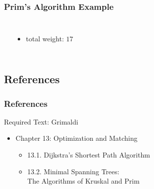 \documentclass[dvipsnames]{beamer}
\begin{document}
\begin{frame}
  \frametitle{Prim's Algorithm Example}

  \begin{example}[$7 \nless 7$]
    \begin{columns}
      \begin{center}
      \end{center}

      \begin{itemize}
        \item total weight: $17$
      \end{itemize}
    \end{columns}
  \end{example}
\end{frame}

\subsection*{References}

\begin{frame}
  \frametitle{References}

  \begin{block}{Required Text: Grimaldi}
    \begin{itemize}
      \item Chapter 13: Optimization and Matching
      \begin{itemize}
        \item 13.1. \alert{Dijkstra's Shortest Path Algorithm}
        \item 13.2. \alert{Minimal Spanning Trees:\\
			   The Algorithms of Kruskal and Prim}
      \end{itemize}
    \end{itemize}
  \end{block}
\end{frame}
\end{document}
